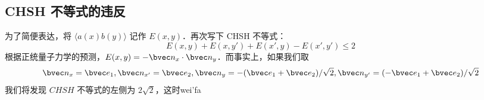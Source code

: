 \subsection{CHSH 不等式的违反}
为了简便表达，将 $\langle a(x)b(y)\rangle$ 记作 $E(x,y)$．再次写下 CHSH 不等式：
\begin{equation}
E(x,y)+E(x,y')+E(x',y)-E(x',y')\le 2
\end{equation}
根据正统量子力学的预测，$E(x,y)=-\bvec n_x\cdot \bvec n_y$．而事实上，如果我们取
\begin{equation}
\bvec n_x=\bvec e_1,
\bvec n_{x'}=\bvec e_2,
\bvec n_y=-(\bvec e_1+\bvec e_2)/\sqrt{2},
\bvec n_{y'}=(-\bvec e_1+\bvec e_2)/\sqrt{2}
\end{equation}
我们将发现 $CHSH$ 不等式的左侧为 $2\sqrt{2}$，这时wei'fa